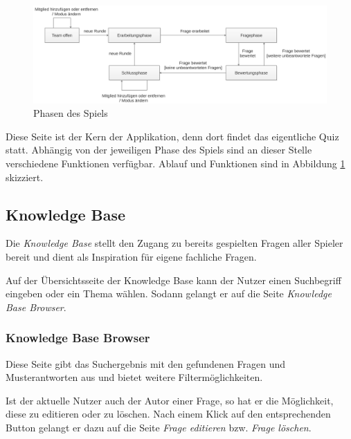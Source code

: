 \documentclass[a4paper,11pt,listof=numbered,glossary=totoc,parskip=half,toc=bib]{scrreprt}
\begin{document}
	\begin{figure}
		\centering
		\includegraphics[width=\textwidth]{ablauf}
		\caption{Phasen des Spiels}
		\label{fig:phasen}
	\end{figure}
		
	Diese Seite ist der Kern der Applikation, denn dort findet das eigentliche Quiz statt. Abhängig von der jeweiligen Phase des Spiels sind an dieser Stelle verschiedene Funktionen verfügbar. Ablauf und Funktionen sind in Abbildung \ref{fig:phasen} skizziert.
	
	
	\subsection{Knowledge Base}
	Die \textit{Knowledge Base} stellt den Zugang zu bereits gespielten Fragen aller Spieler bereit und dient als Inspiration für eigene fachliche Fragen.
	
	Auf der Übersichtsseite der Knowledge Base kann der Nutzer einen Suchbegriff eingeben oder ein Thema wählen. Sodann gelangt er auf die Seite \textit{Knowledge Base Browser}.
	
	\subsubsection{Knowledge Base Browser}
	Diese Seite gibt das Suchergebnis mit den gefundenen Fragen und Musterantworten aus und bietet weitere Filtermöglichkeiten.
	
	Ist der aktuelle Nutzer auch der Autor einer Frage, so hat er die Möglichkeit, diese zu editieren oder zu löschen. Nach einem Klick auf den entsprechenden Button gelangt er dazu auf die Seite \textit{Frage editieren} bzw. \textit{Frage löschen}.

	\setcounter{chapter}{0}
	
	
	
\end{document}
